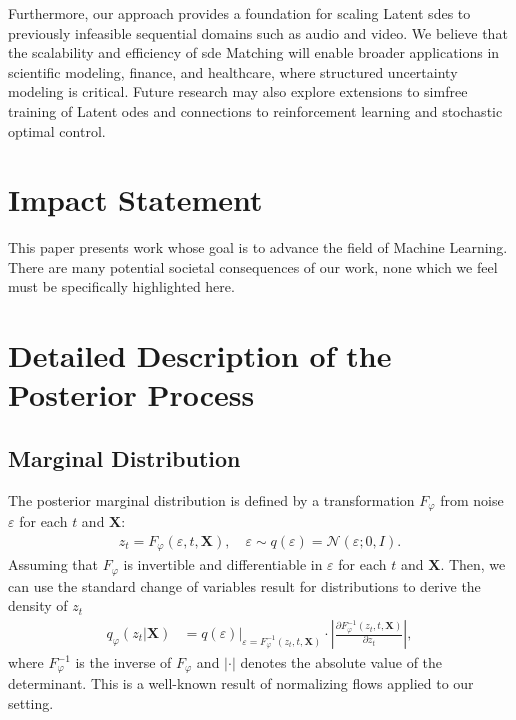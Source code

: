 \documentclass{article}
\def\N{\mathcal{N}}
\def\X{\mathbf{X}}
\def\e{\varepsilon}
\def\ph{\varphi}
\def\p{\partial}
\theoremstyle{plain}
\theoremstyle{definition}
\theoremstyle{remark}
\begin{document}
Furthermore, our approach provides a foundation for scaling Latent \glspl{sde} to previously infeasible sequential domains such as audio and video. We believe that the scalability and efficiency of \gls{sde} Matching will enable broader applications in scientific modeling, finance, and healthcare, where structured uncertainty modeling is critical. Future research may also explore extensions to \gls{simfree} training of Latent \glspl{ode} and connections to reinforcement learning and stochastic optimal control.


\section*{Impact Statement}


This paper presents work whose goal is to advance the field of Machine Learning. There are many potential societal consequences of our work, none which we feel must be specifically highlighted here.






\newpage
\appendix
\onecolumn
\section{Detailed Description of the Posterior Process}
\label{app:posterior}

\subsection{Marginal Distribution}
\label{app:posteriormarginal}
The posterior marginal distribution is defined by a transformation $F_\ph$ from noise $\e$ for each $t$ and $\X$:
\begin{align}
    z_t = F_\ph(\e, t, \X), \quad \e \sim q(\e) = \N(\e; 0, I).
\end{align}
Assuming that $F_\ph$ is invertible and differentiable in $\e$ for each $t$ and $\X$. Then, we can use the standard change of variables result for distributions \citep{rudin2006real,bogachev2007measure} to derive the density of $z_t$
\begin{align}
    q_\ph(z_t|\X) &= q(\e) \Big|_{\e = F_\ph^{-1}(z_t, t, \X)} \cdot \left| \frac{\p F^{-1}_\ph(z_t, t, \X)}{\p z_t} \right|,
    \label{eq:app_marginal}
\end{align}
where $F^{-1}_\ph$ is the inverse of $F_\ph$ and $|\cdot|$ denotes the absolute value of the determinant. This is a well-known result of normalizing flows \citep{papamakarios2021normalizing} applied to our setting.
\end{document}
